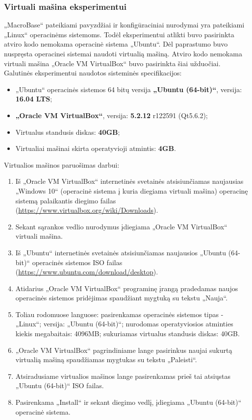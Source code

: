 \documentclass{VUMIFPSkursinis}
\begin{document}
\subsubsection{Virtuali mašina eksperimentui} \label{subsubsec:virtual}
„MacroBase“ pateikiami pavyzdžiai ir konfigūraciniai nurodymai yra pateikiami „Linux“ operacinėms sistemoms. Todėl eksperimentui atlikti buvo pasirinkta atviro kodo nemokama operacinė sistema „Ubuntu“. Dėl paprastumo buvo nuspręsta operacinei sistemai naudoti virtualią mašiną. Atviro kodo nemokama virtuali mašina „Oracle VM VirtualBox“ buvo pasirinkta šiai užduočiai. Galutinės eksperimentui naudotos sisteminės specifikacijos:
\begin{itemize}
\item „Ubuntu“ operacinės sistemos 64 bitų versija \textbf{„Ubuntu (64-bit)“}, versija: \textbf{16.04 LTS};
\item \textbf{„Oracle VM VirtualBox“}, versija: \textbf{5.2.12} r122591 (Qt5.6.2);
\item Virtualus standusis diskas: \textbf{40GB};
\item Virtualiai mašinai skirta operatyvioji atmintis: \textbf{4GB}.

\end{itemize}

Virtualios mašinos paruošimas darbui:
\begin{enumerate}
\item  Iš „Oracle VM VirtualBox“ internetinės svetainės atsisiunčiamas naujausias „Windows 10“ (operacinė sistema į kuria diegiama virtuali mašina) operacinę sistemą palaikantis diegimo failas (\url{https://www.virtualbox.org/wiki/Downloads}).
\item Sekant sąrankos vedlio nurodymus įdiegiama „Oracle VM VirtualBox“ virtuali mašina.
\item Iš „Ubuntu“ internetinės svetainės atsisiunčiamas naujausios „Ubuntu (64-bit)“ operacinės sistemos ISO failas (\url{https://www.ubuntu.com/download/desktop}).
\item Atidarius „Oracle VM VirtualBox“ programinę įrangą pradedamas naujos operacinės sistemos pridėjimas spaudžiant mygtuką su tekstu „Nauja“.
\item Toliau rodomuose languose: pasirenkamas operacinės sistemos tipas - „Linux“; versija: „Ubuntu (64-bit)“; nurodomas operatyviosios atminties kiekis megabaitais: 4096MB; sukuriamas virtualus standusis diskas: 40GB.
\item „Oracle VM VirtualBox“ pagrindiniame lange pasirinkus naujai sukurtą virtualią mašiną spaudžiamas mygtukas su tekstu „Paleisti“.
\item Atsiradusiame virtualios mašinos lange pasirenkamas prieš tai atsiųstas „Ubuntu (64-bit)“ ISO failas.
\item Pasirenkama „Install“ ir sekant diegimo vedlį, įdiegiama „Ubuntu (64-bit)“ operacinė sistema.
\end{enumerate}
\end{document}

